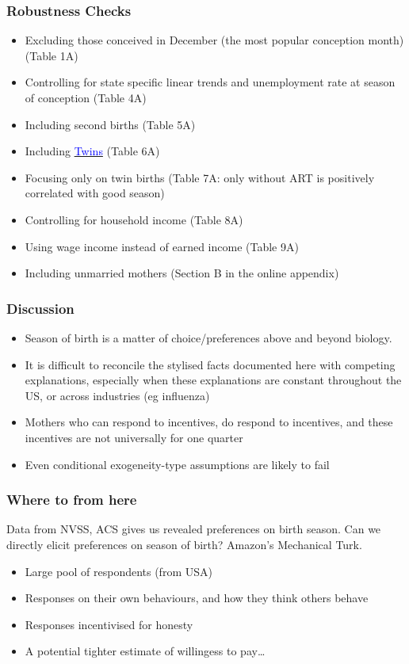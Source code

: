 \documentclass[10pt,letterpaper,subeqn]{beamer}
\begin{document}
\begin{frame}
\hypertarget{robustness}{}
\frametitle{Robustness Checks}
\begin{itemize}
\item Excluding those conceived in December (the most popular conception month) (Table 1A)
\item Controlling for state specific linear trends and unemployment rate at season of conception (Table 4A)
\item Including second births (Table 5A)
\item Including \hyperlink{twins}{\textcolor{blue}{Twins}} (Table 6A)
\item Focusing only on twin births (Table 7A: only without ART is positively correlated with good season)
\item Controlling for household income (Table 8A)
\item Using wage income instead of earned income (Table 9A)
\item Including unmarried mothers (Section B in the online appendix)
\end{itemize}
\end{frame}

\begin{frame}
\frametitle{Discussion}
\begin{itemize}
\item Season of birth is a matter of choice/preferences above and beyond biology.
\item It is difficult to reconcile the stylised facts documented here with competing explanations, especially when these explanations are constant throughout the US, or across industries (eg influenza)
\item Mothers who can respond to incentives, do respond to incentives, and these incentives are not universally for one quarter
\item Even conditional exogeneity-type assumptions are likely to fail
\end{itemize}
\end{frame}


\begin{frame}
\frametitle{Where to from here}
Data from NVSS, ACS gives us revealed preferences on birth season.  Can we directly elicit preferences on season of birth? Amazon's Mechanical Turk.
\vspace{2mm}
\begin{itemize}
\item Large pool of respondents (from USA)
\item Responses on their own behaviours, and how they think others behave
\item Responses incentivised for honesty
\item A potential tighter estimate of willingess to pay\ldots
\end{itemize}
\end{frame}
\end{document}
